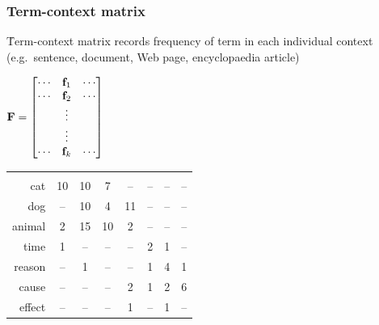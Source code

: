 \begin{frame}
  \frametitle{Term-context matrix}

  \h{Term-context matrix} records frequency of term in each individual context (e.g.\ sentence, document, Web page, encyclopaedia article)
  
  \gap[3]
  \begin{center}
  \(
  \mathbf{F} = 
  \begin{bmatrix}
    \cdots & \vf_1 & \cdots \\
    \cdots & \vf_2 & \cdots \\
    & \vdots & \\
    & \vdots & \\
    \cdots & \vf_k & \cdots \\
  \end{bmatrix}
  \)
  \hspace{5mm}
  \begin{small}
    \setlength{\arrayrulewidth}{1pt}
    \begin{tabular}[c]{r*{7}{|c}|}
      & 
      & 
      & 
      & 
      & 
      & 
      &  \\
      cat      &      10 &  10 &     7 &    -- &         -- &   -- &        -- \\
      dog      &      -- &  10 &     4 &    11 &         -- &   -- &        -- \\
      animal   &       2 &  15 &    10 &     2 &         -- &   -- &        -- \\
      time     &       1 &  -- &    -- &    -- &          2 &    1 &        -- \\
      reason   &      -- &   1 &    -- &    -- &          1 &    4 &         1 \\
      cause    &      -- &  -- &    -- &     2 &          1 &    2 &         6 \\
      effect   &      -- &  -- &    -- &     1 &         -- &    1 &        -- \\
    \end{tabular}
  \end{small}
  \end{center}

\end{frame}

